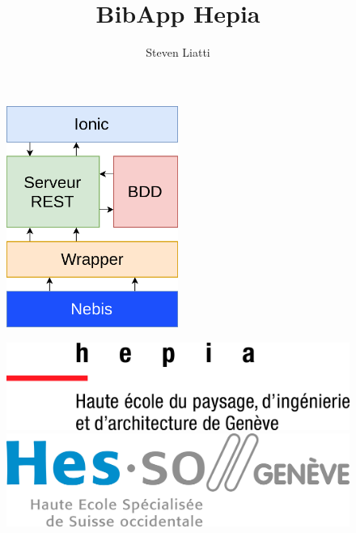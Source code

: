 \documentclass[a4paper, 12pt]{article}
\begin{document}
\title{BibApp Hepia}
\author{Steven Liatti}
\maketitle

\begin{figure}
	\begin{center}
		\includegraphics[width=0.5\textwidth]{images/architecture.png}
	\end{center}
\end{figure}

\begin{figure}[!b]
	\centering
	\begin{minipage}{.5\textwidth}
		\centering
		\includegraphics[width=.7\linewidth]{images/hepia.jpg}
	\end{minipage}%
	\begin{minipage}{.5\textwidth}
		\centering
		\includegraphics[width=.7\linewidth]{images/hesso.jpg}
	\end{minipage}
\end{figure}
\newpage
\end{document}
